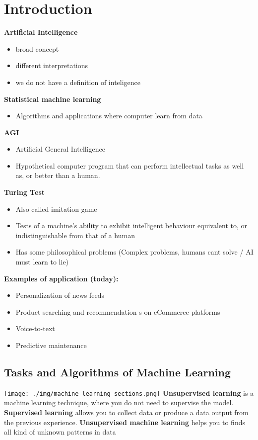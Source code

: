 
\section{Introduction}
\textbf{Artificial Intelligence}
\begin{itemize}
    \item broad concept
    \item different interpretations
    \item we do not have a definition of inteligence
\end{itemize}
\textbf{Statistical machine learning}
\begin{itemize}
    \item Algorithms and applications where computer learn from data
\end{itemize}
\textbf{AGI}
\begin{itemize}
    \item Artificial General Intelligence
    \item Hypothetical computer program that can perform intellectual tasks as well as, or better than a human.
\end{itemize}
\textbf{Turing Test}
\begin{itemize}
    \item Also called imitation game
    \item Tests of a machine's ability to exhibit intelligent behaviour equivalent to, or indistinguishable from that of a human
    \item Has some philosophical problems (Complex problems, humans cant solve / AI must learn to lie)
\end{itemize}
\textbf{Examples of application (today):}
\begin{itemize}
    \item Personalization of news feeds
    \item Product searching and recommendation s on eCommerce platforms
    \item Voice-to-text
    \item Predictive maintenance
\end{itemize}
\subsection{Tasks and Algorithms of Machine Learning}
\texttt{[image: ./img/machine\_learning\_sections.png]}
\textbf{Unsupervised learning} is a machine learning technique, where you do not need to supervise the model. \textbf{Supervised learning} allows you to collect data or produce a data output from the previous experience. \textbf{Unsupervised machine learning } helps you to finds all kind of unknown patterns in data

